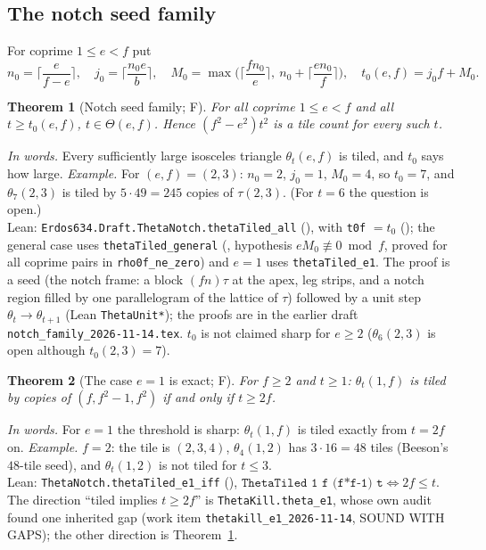\documentclass[11pt,reqno]{amsart}
\theoremstyle{plain}
\newtheorem{theorem}{Theorem}[section]
\theoremstyle{definition}
\newcommand{\sF}{\textup{\textsf{F}}}
\newcommand{\rec}[1]{\textup{\texttt{#1}}}
\begin{document}
\subsection{The notch seed family}\label{sub:band:notch}
For coprime $1\le e<f$ put
\[
 n_0=\Big\lceil\frac{e}{f-e}\Big\rceil,\quad j_0=\Big\lceil\frac{n_0e}{b}\Big\rceil,\quad
 M_0=\max\Big(\Big\lceil\frac{fn_0}{e}\Big\rceil,\ n_0+\Big\lceil\frac{en_0}{f}\Big\rceil\Big),\quad
 t_0(e,f)=j_0f+M_0 .
\]

\begin{theorem}[Notch seed family; \sF]\label{thm:notch}
For all coprime $1\le e<f$ and all $t\ge t_0(e,f)$, $t\in\Theta(e,f)$. Hence $(f^2-e^2)t^2$ is a tile count for
every such $t$.
\end{theorem}
\noindent\emph{In words.} Every sufficiently large isosceles triangle $\theta_t(e,f)$ is tiled, and $t_0$ says how large.
\emph{Example.} For $(e,f)=(2,3)$: $n_0=2$, $j_0=1$, $M_0=4$, so $t_0=7$, and $\theta_7(2,3)$ is tiled by $5\cdot49=245$ copies of $\tau(2,3)$.
(For $t=6$ the question is open.)\\
\noindent Lean: \texttt{Erdos634.Draft.ThetaNotch.thetaTiled\_all}
(), with \texttt{t0f} $=t_0$ (); the general case uses
\texttt{thetaTiled\_general} (, hypothesis $e M_0\not\equiv0\bmod f$, proved for
all coprime pairs in \texttt{rho0f\_ne\_zero}) and $e=1$ uses \texttt{thetaTiled\_e1}. The proof is a seed (the
notch frame: a block $(fn)\tau$ at the apex, leg strips, and a notch region filled by one parallelogram of
the lattice of $\tau$) followed by a unit step $\theta_t\to\theta_{t+1}$ (Lean \texttt{ThetaUnit*}); the proofs are in the
earlier draft \rec{notch\_family\_2026-11-14.tex}. $t_0$ is not claimed sharp for $e\ge2$ ($\theta_6(2,3)$ is open
although $t_0(2,3)=7$).

\begin{theorem}[The case $e=1$ is exact; \sF]\label{thm:e1}
For $f\ge2$ and $t\ge1$: $\theta_t(1,f)$ is tiled by copies of $(f,f^2-1,f^2)$ if and only if $t\ge2f$.
\end{theorem}
\noindent\emph{In words.} For $e=1$ the threshold is sharp: $\theta_t(1,f)$ is tiled exactly from $t=2f$ on.
\emph{Example.} $f=2$: the tile is $(2,3,4)$, $\theta_4(1,2)$ has $3\cdot16=48$ tiles (Beeson's $48$-tile seed), and
$\theta_t(1,2)$ is not tiled for $t\le3$.\\
\noindent Lean: \texttt{ThetaNotch.thetaTiled\_e1\_iff} (), $\texttt{ThetaTiled 1 f (f*f-1) t}\iff 2f\le t$.
The direction ``tiled implies $t\ge2f$'' is \texttt{ThetaKill.theta\_e1}, whose own audit found one inherited gap
(work item \rec{thetakill\_e1\_2026-11-14}, SOUND WITH GAPS); the other direction is Theorem~\ref{thm:notch}.
\end{document}
